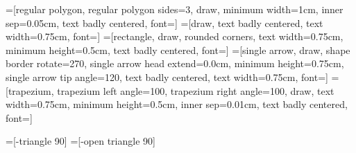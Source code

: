 =[regular polygon,
                  regular polygon sides=3,
                  draw,
                  minimum width=1cm,
                  inner sep=0.05cm,
                  text badly centered,
                  font=\scriptsize]
=[draw,
                 text badly centered,
                 text width=0.75cm,
                 font=\scriptsize]
=[rectangle,
                  draw,
                  rounded corners,
                  text width=0.75cm,
                  minimum height=0.5cm,
                  text badly centered,
                  font=\scriptsize]
=[single arrow,
                      draw,
                      shape border rotate=270,
                      single arrow head extend=0.0cm,
                      minimum height=0.75cm,
                      single arrow tip angle=120,
                      text badly centered,
                      text width=0.75cm,
                      font=\scriptsize]
=[trapezium,
                     trapezium left angle=100,
                     trapezium right angle=100,
                     draw,
                     text width=0.75cm,
                     minimum height=0.5cm,
                     inner sep=0.01cm,
                     text badly centered,
                     font=\scriptsize]

=[-triangle 90]
=[-open triangle 90]

